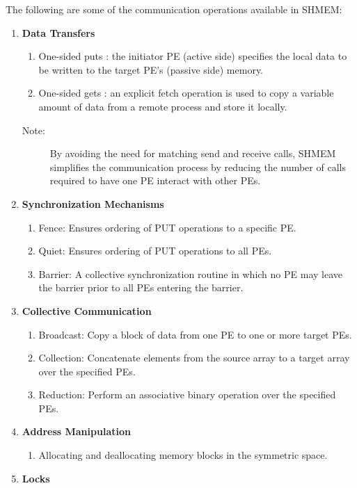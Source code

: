 \medskip{}
The following are some of the communication operations available in
SHMEM:
\begin{enumerate}
\item \textbf{Data Transfers }

\begin{enumerate}
\item One-sided puts : the initiator PE (active side) specifies the local
data to be written to the target PE's (passive side) memory. 
\item One-sided gets : an explicit fetch operation is used to copy a variable
amount of data from a remote process and store it locally.\end{enumerate}
\begin{description}
\item [{{Note:}}] By avoiding the need for matching send and receive
calls, SHMEM simplifies the communication process by reducing the
number of calls required to have one PE interact with other PEs. 
\end{description}
\item \textbf{Synchronization Mechanisms }

\begin{enumerate}
\item Fence: Ensures ordering of PUT operations to a specific PE. 
\item Quiet: Ensures ordering of PUT operations to all PEs. 
\item Barrier: A collective synchronization routine in which no PE may leave
the barrier prior to all PEs entering the barrier. 
\end{enumerate}
\item \textbf{Collective Communication}

\begin{enumerate}
\item Broadcast: Copy a block of data from one PE to one or more target
PEs. 
\item Collection: Concatenate elements from the source array to a target
array over the specified PEs. 
\item Reduction: Perform an associative binary operation over the specified
PEs. 
\end{enumerate}
\item \textbf{Address Manipulation}

\begin{enumerate}
\item Allocating and deallocating memory blocks in the symmetric space.
\end{enumerate}
\item \textbf{Locks}


\end{enumerate}
